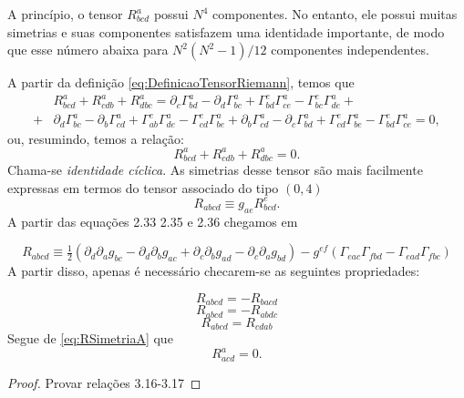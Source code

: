  A princípio, o tensor $R^a_{bcd}$ possui $N^4$ componentes. No entanto, ele possui muitas simetrias e suas componentes satisfazem uma identidade importante, de modo que esse número abaixa para $N^2(N^2-1)/12$ componentes independentes. 
 
 A partir da definição \eqref{eq:DefinicaoTensorRiemann}, temos que
\begin{align*}
	&R_{b c d}^{a}+R_{c d b}^{a}+R_{d b c}^{a}= 
	\partial_{c} \Gamma_{bd}^{a}-\partial_{d} \Gamma_{bc}^{a}+\Gamma_{bd}^{e}
	\Gamma_{ce}^{a}-\Gamma_{bc}^{e} \Gamma_{de}^{a} + \\
	+&\partial_{d} \Gamma_{bc}^{a}-\partial_{b} \Gamma_{cd}^{a}+\Gamma_{ab}^{e} \Gamma_{de}^{a}-\Gamma_{cd}^{e} \Gamma_{be}^{a} +
	\partial_{b} \Gamma_{cd}^{a}-\partial_{c} \Gamma_{bd}^{a}+\Gamma_{cd}^{e} \Gamma_{be}^{a}-\Gamma_{bd}^{e} \Gamma_{ce}^{a}=0,
\end{align*}
ou, resumindo, temos a relação:
 \begin{equation}\label{eq:IdentidadeCiclicaTensorDeCurvatura}
	 R^a_{bcd}+R^a_{cdb}+R^a_{dbc}=0.
 \end{equation}
 Chama-se \textit{identidade cíclica}. As simetrias desse tensor são mais facilmente expressas em termos do tensor associado do tipo $(0,4)$
\[
	R_{abcd} \equiv g_{ae}R^e_{bcd}.
\]
{\color{red}
A partir das equações 2.33 2.35 e 2.36 chegamos em
}

\begin{equation}
	R_{a b c d} \equiv \tfrac{1}{2}\left(\partial_{d} \partial_{a} g_{b c}-\partial_{d} \partial_{b} g_{a c}+\partial_{c} \partial_{b} g_{a d}-\partial_{c} \partial_{a} g_{b d}\right)-g^{e f}\left(\Gamma_{e a c} \Gamma_{f b d}-\Gamma_{e a d} \Gamma_{f b c}\right)
\end{equation}
A partir disso, apenas é necessário checarem-se as seguintes propriedades:

\begin{equation}\label{eq:RSimetriaA}
	R_{abcd}=-R_{bacd}
\end{equation}
\begin{equation}\label{eq:RSimetriaB}
	R_{abcd}=-R_{abdc}
\end{equation}
\begin{equation}\label{eq:RSimetriaC}
	R_{abcd}=R_{cdab}
\end{equation}
Segue de \eqref{eq:RSimetriaA} que
\[
R^a_{acd} = 0.
\]


\begin{proof}
	Provar relações 3.16-3.17
\end{proof}


